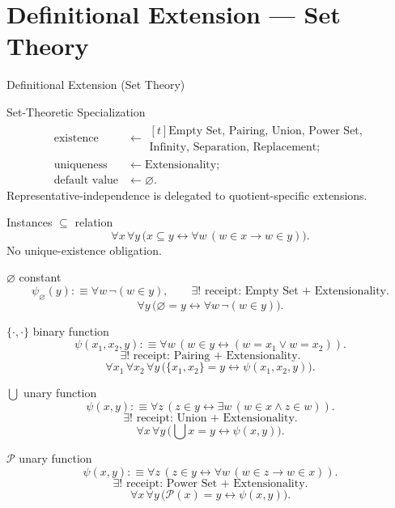 \documentclass[12pt, a4paper]{report}
\begin{document}
\clearpage
\section*{Definitional Extension --- Set Theory}

\begin{modelbox}{Definitional Extension (Set Theory)}

\begin{modelcomponent}{Set-Theoretic Specialization}
\begin{align*}
  \text{existence} &\leftarrow
  \begin{gathered}[t]
    \text{Empty Set, Pairing, Union, Power Set,}\\
    \text{Infinity, Separation, Replacement};
  \end{gathered}\\
  \text{uniqueness} &\leftarrow \text{Extensionality};\\
  \text{default value} &\leftarrow \varnothing.
\end{align*}
Representative-independence is delegated to quotient-specific extensions.
\end{modelcomponent}

\begin{modelcomponent}{Instances}
\textbf{\(\subseteq\)} relation
\[
\forall x\,\forall y\,
\bigl(x\subseteq y\leftrightarrow
  \forall w\,(w\in x\to w\in y)\bigr).
\]
No unique-existence obligation.

\textbf{\(\varnothing\)} constant
\[
\psi_{\varnothing}(y):\equiv \forall w\,\neg(w\in y),
\qquad
\exists!\text{ receipt: Empty Set + Extensionality}.
\]
\[
\forall y\,
\bigl(\varnothing=y\leftrightarrow \forall w\,\neg(w\in y)\bigr).
\]

\textbf{\(\{\cdot,\cdot\}\)} binary function
\[
\psi(x_1,x_2,y):\equiv
\forall w\,(w\in y\leftrightarrow (w=x_1\vee w=x_2)).
\]
\[
\exists!\text{ receipt: Pairing + Extensionality}.
\]
\[
\forall x_1\,\forall x_2\,\forall y\,
\bigl(\{x_1,x_2\}=y\leftrightarrow\psi(x_1,x_2,y)\bigr).
\]

\textbf{\(\bigcup\)} unary function
\[
\psi(x,y):\equiv
\forall z\,(z\in y\leftrightarrow\exists w\,(w\in x\wedge z\in w)).
\]
\[
\exists!\text{ receipt: Union + Extensionality}.
\]
\[
\forall x\,\forall y\,
\bigl(\textstyle\bigcup x=y\leftrightarrow\psi(x,y)\bigr).
\]

\textbf{\(\mathcal P\)} unary function
\[
\psi(x,y):\equiv
\forall z\,(z\in y\leftrightarrow\forall w\,(w\in z\to w\in x)).
\]
\[
\exists!\text{ receipt: Power Set + Extensionality}.
\]
\[
\forall x\,\forall y\,
\bigl(\mathcal P(x)=y\leftrightarrow\psi(x,y)\bigr).
\]
\end{modelcomponent}
\end{modelbox}
\end{document}
